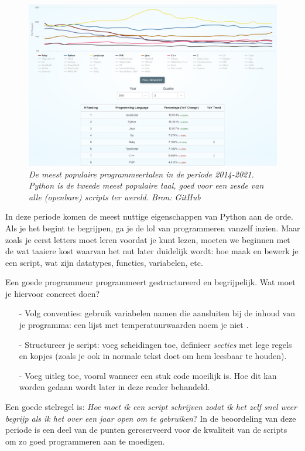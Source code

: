 \documentclass[a4paper,11pt, fleqn]{article}
\begin{document}
\begin{figure}[h]
	\includegraphics[width=16cm]{fig/github_languages.png}
	\caption{\it De meest populaire programmeertalen in de periode 2014-2021. Python is de tweede meest populaire taal, goed voor een zesde van alle (openbare) scripts ter wereld. \textit{Bron: GitHub}}
	\label{github-languages}
\end{figure}

In deze periode komen de meest nuttige eigenschappen van Python aan de orde. Als je het begint te begrijpen, ga je de lol van programmeren vanzelf inzien. Maar zoals je eerst letters moet leren voordat je kunt lezen, moeten we beginnen met de wat taaiere kost waarvan het nut later duidelijk wordt: hoe maak en bewerk je een script, wat zijn datatypes, functies, variabelen, etc.

Een goede programmeur programmeert gestructureerd en begrijpelijk. Wat moet je hiervoor concreet doen?
\begin{itemize}
\item[-] Volg conventies: gebruik variabelen namen die aansluiten bij de inhoud van je programma: een lijst met temperatuurwaarden noem je niet .
\item[-] Structureer je script: voeg scheidingen toe, definieer \textit{secties} met lege regels en kopjes (zoals je ook in normale tekst doet om hem leesbaar te houden).
\item[-] Voeg uitleg toe, vooral wanneer een stuk code moeilijk is. Hoe dit kan worden gedaan wordt later in deze reader behandeld.
\end{itemize}

Een goede stelregel is: \textit{Hoe moet ik een script schrijven zodat ik het zelf snel weer begrijp als ik het over een jaar open om te gebruiken}? In de beoordeling van deze periode is een deel van de punten gereserveerd voor de kwaliteit van de scripts om zo goed programmeren aan te moedigen.
\end{document}
